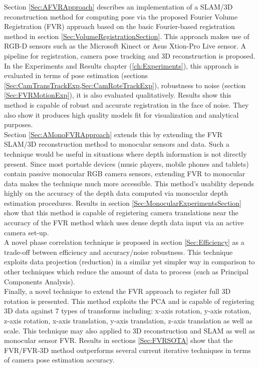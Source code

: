 Section \ref{Sec:AFVRApproach} describes an implementation of a SLAM/3D reconstruction method for computing pose via the proposed Fourier Volume Registration (FVR) approach based on the basic Fourier-based registration method in section \ref{Sec:VolumeRegistrationSection}. This approach makes use of RGB-D sensors such as the Microsoft Kinect or Asus Xtion-Pro Live sensor. A pipeline for registration, camera pose tracking and 3D reconstruction is proposed. In the Experiments and Results chapter (\ref{ch:Experiments}), this approach is evaluated in terms of pose estimation (sections \ref{Sec:CamTransTrackExp,Sec:CamRoteTrackExp}), robustness to noise (section \ref{Sec:FVRMotionExp}), it is also evaluated qualitatively. Results show this method is capable of robust and accurate registration in the face of noise. They also show it produces high quality models fit for visualization and analytical purposes.  \\

Section \ref{Sec:AMonoFVRApproach} extends this by extending the FVR SLAM/3D reconstruction method to monocular sensors and data. Such a technique would be useful in situations where depth information is not directly present. Since most portable devices (music players, mobile phones and tablets) contain passive monocular RGB camera sensors, extending FVR to monocular data makes the technique much more accessible. This method's usability depends highly on the accuracy of the depth data computed via monocular depth estimation procedures. Results in section \ref{Sec:MonocularExperimentsSection} show that this method is capable of registering camera translations near the accuracy of the FVR method which uses dense depth data input via an active camera set-up.  \\

A novel phase correlation technique is proposed in section \ref{Sec:Efficiency} as a trade-off between efficiency and accuracy/noise robustness. This technique exploits data projection (reduction) in a similar yet simpler way in comparison to other techniques which reduce the amount of data to process (such as Principal Components Analysis). \\

Finally, a novel technique to extend the FVR approach to register full 3D rotation is presented. This method exploits the PCA and is capable of registering 3D data against 7 types of transforms including: x-axis rotation, y-axis rotation, z-axis rotation, x-axis translation, y-axis translation, z-axis translation as well as scale. This technique may also applied to 3D reconstruction and SLAM as well as monocular sensor FVR. Results in sections \ref{Sec:FVRSOTA} show that the FVR/FVR-3D method outperforms several current iterative techniques in terms of camera pose estimation accuracy.  \\